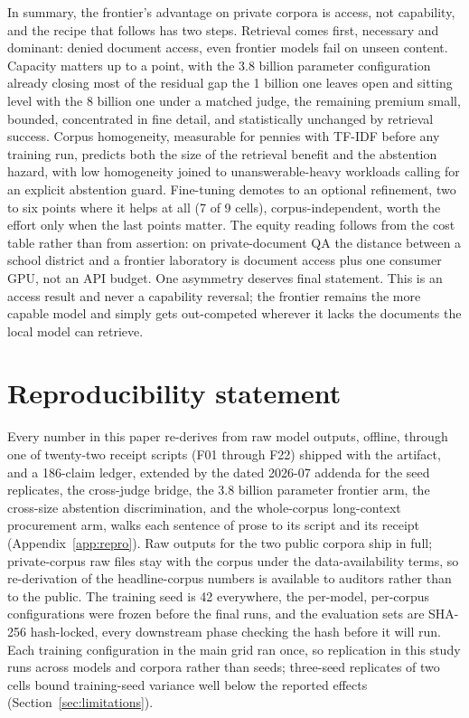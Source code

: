 \documentclass[11pt]{article}
\begin{document}
In summary, the frontier's advantage on private corpora is access, not capability, and the recipe that follows has two steps. Retrieval comes first, necessary and dominant: denied document access, even frontier models fail on unseen content. Capacity matters up to a point, with the 3.8 billion parameter configuration already closing most of the residual gap the 1 billion one leaves open and sitting level with the 8 billion one under a matched judge, the remaining premium small, bounded, concentrated in fine detail, and statistically unchanged by retrieval success. Corpus homogeneity, measurable for pennies with TF-IDF before any training run, predicts both the size of the retrieval benefit and the abstention hazard, with low homogeneity joined to unanswerable-heavy workloads calling for an explicit abstention guard. Fine-tuning demotes to an optional refinement, two to six points where it helps at all (7 of 9 cells), corpus-independent, worth the effort only when the last points matter. The equity reading follows from the cost table rather than from assertion: on private-document QA the distance between a school district and a frontier laboratory is document access plus one consumer GPU, not an API budget. One asymmetry deserves final statement. This is an access result and never a capability reversal; the frontier remains the more capable model and simply gets out-competed wherever it lacks the documents the local model can retrieve.

\section*{Reproducibility statement}
Every number in this paper re-derives from raw model outputs, offline, through one of twenty-two receipt scripts (F01 through F22) shipped with the artifact, and a 186-claim ledger, extended by the dated 2026-07 addenda for the seed replicates, the cross-judge bridge, the 3.8 billion parameter frontier arm, the cross-size abstention discrimination, and the whole-corpus long-context procurement arm, walks each sentence of prose to its script and its receipt (Appendix~\ref{app:repro}). Raw outputs for the two public corpora ship in full; private-corpus raw files stay with the corpus under the data-availability terms, so re-derivation of the headline-corpus numbers is available to auditors rather than to the public. The training seed is 42 everywhere, the per-model, per-corpus configurations were frozen before the final runs, and the evaluation sets are SHA-256 hash-locked, every downstream phase checking the hash before it will run. Each training configuration in the main grid ran once, so replication in this study runs across models and corpora rather than seeds; three-seed replicates of two cells bound training-seed variance well below the reported effects (Section~\ref{sec:limitations}).
\end{document}
